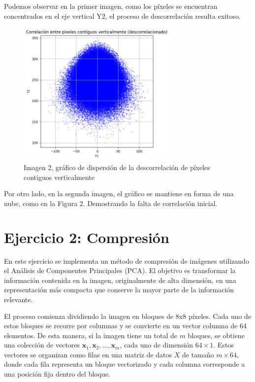 \documentclass[a4paper,12pt]{article}
\numberwithin{equation}{section}
\numberwithin{figure}{section}
\begin{document}
Podemos observar en la primer imagen, como los píxeles se encuentran concentrados en el eje vertical Y2, el proceso de descorrelación resulta exitoso.

\begin{figure}[H]
    \centering
    \includegraphics[width=0.7\textwidth]{Ejercicio1d.png}
    \caption{Imagen 2, gráfico de dispersión de la descorrelación de píxeles contiguos verticalmente}
    \label{fig:descorrelacion2}
\end{figure}

Por otro lado, en la segunda imagen, el gráfico se mantiene en forma de una nube, como en la Figura 2. Demostrando la falta de correlación inicial.

\section {Ejercicio 2: Compresión}


En este ejercicio se implementa un método de compresión de imágenes utilizando el Análisis de Componentes Principales (PCA). El objetivo es transformar la información contenida en la imagen, originalmente de alta dimensión, en una representación más compacta que conserve la mayor parte de la información relevante.

El proceso comienza dividiendo la imagen en bloques de 8x8 píxeles. Cada uno de estos bloques se recorre por columnas y se convierte en un vector columna de 64 elementos. De esta manera, si la imagen tiene un total de $m$ bloques, se obtiene una colección de vectores $\mathbf{x}_1, \mathbf{x}_2, \ldots, \mathbf{x}_m$, cada uno de dimensión $64 \times 1$. Estos vectores se organizan como filas en una matriz de datos $X$ de tamaño $m \times 64$, donde cada fila representa un bloque vectorizado y cada columna corresponde a una posición fija dentro del bloque.
\end{document}
